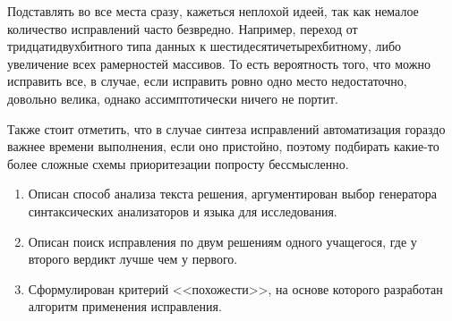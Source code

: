 Подставлять во все места сразу, кажеться неплохой идеей, так как немалое количество исправлений часто безвредно.
Например, переход от тридцатидвухбитного типа данных к шестидесятичетырехбитному, либо увеличение всех рамерностей массивов.
То есть вероятность того, что можно исправить все, в случае, если исправить ровно одно место недостаточно, довольно велика,
однако ассимптотически ничего не портит.

Также стоит отметить, что в случае синтеза исправлений автоматизация гораздо важнее времени выполнения, если оно пристойно, поэтому
подбирать какие-то более сложные схемы приоритезации попросту бессмысленно.

\chapterconclusion

\begin{enumerate}
    \item Описан способ анализа текста решения, аргументирован выбор генератора синтаксических анализаторов и языка для исследования.
    \item Описан поиск исправления по двум решениям одного учащегося, где у второго вердикт лучше чем у первого.
    \item Сформулирован критерий <<похожести>>, на основе которого разработан алгоритм применения исправления.
\end{enumerate}
